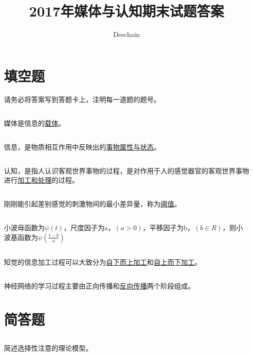 \documentclass[UTF8]{ctexart}
\title{2017年媒体与认知期末试题答案}
\author{Deschain}
\begin{document}
\maketitle
\section{填空题}
请务必将答案写到答题卡上，注明每一道题的题号。
\subsection{}
媒体是信息的\underline{载体}。
\subsection{}
信息，是物质相互作用中反映出的\underline{事物属性与状态}。
\subsection{}
认知，是指人认识客观世界事物的过程，是对作用于人的感觉器官的客观世界事物进行\underline{加工和处理}的过程。
\subsection{}
刚刚能引起差别感觉的刺激物间的最小差异量，称为\underline{阈值}。
\subsection{}
小波母函数为$\psi(t)$，尺度因子为a，$(a>0)$，平移因子为b，$(b\in R)$，则小波基函数为\underline{$\psi(\frac{t-b}{a})$}
\subsection{}
知觉的信息加工过程可以大致分为\underline{自下而上加工}和\underline{自上而下加工}。
\subsection{}
神经网络的学习过程主要由正向传播和\underline{反向传播}两个阶段组成。
\section{简答题}
\subsection{}
简述选择性注意的理论模型。
\end{document}

